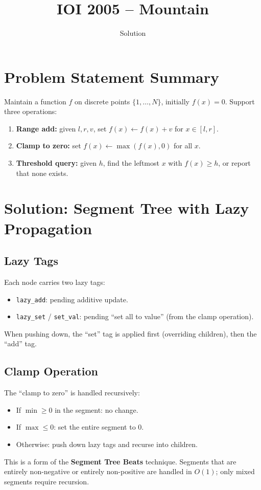 \documentclass[11pt,a4paper]{article}
\title{IOI 2005 -- Mountain}
\author{Solution}
\date{}
\begin{document}
\maketitle

\section{Problem Statement Summary}
Maintain a function $f$ on discrete points $\{1, \ldots, N\}$,
initially $f(x) = 0$. Support three operations:
\begin{enumerate}
  \item \textbf{Range add:} given $l, r, v$, set $f(x) \gets f(x) + v$
        for $x \in [l, r]$.
  \item \textbf{Clamp to zero:} set $f(x) \gets \max(f(x), 0)$ for
        all $x$.
  \item \textbf{Threshold query:} given $h$, find the leftmost $x$
        with $f(x) \ge h$, or report that none exists.
\end{enumerate}

\section{Solution: Segment Tree with Lazy Propagation}

\subsection{Lazy Tags}
Each node carries two lazy tags:
\begin{itemize}
  \item \texttt{lazy\_add}: pending additive update.
  \item \texttt{lazy\_set} / \texttt{set\_val}: pending ``set all to
        value'' (from the clamp operation).
\end{itemize}
When pushing down, the ``set'' tag is applied first (overriding
children), then the ``add'' tag.

\subsection{Clamp Operation}
The ``clamp to zero'' is handled recursively:
\begin{itemize}
  \item If $\min \ge 0$ in the segment: no change.
  \item If $\max \le 0$: set the entire segment to 0.
  \item Otherwise: push down lazy tags and recurse into children.
\end{itemize}
This is a form of the \textbf{Segment Tree Beats} technique. Segments
that are entirely non-negative or entirely non-positive are handled in
$O(1)$; only mixed segments require recursion.
\end{document}

